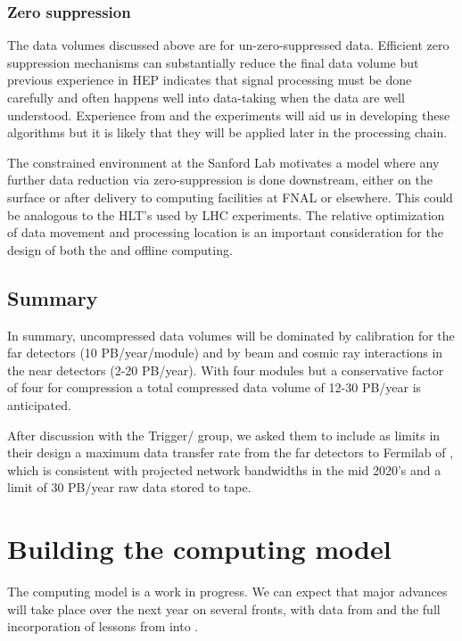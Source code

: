 \subsubsection{Zero suppression}

The data volumes discussed above are for un-zero-suppressed data.  Efficient zero suppression mechanisms can substantially reduce the final data volume but previous experience in HEP indicates that signal processing must be done carefully and often happens well into data-taking when the data are well understood.  Experience from   and the  experiments will aid us in developing these algorithms but it is likely that they will be applied later in the processing chain. 

The constrained environment at the Sanford Lab motivates a model where any further data reduction via zero-suppression is done downstream, either on the surface or after delivery to computing facilities at FNAL or elsewhere. This could be analogous to the HLT's used by LHC experiments. The relative optimization of data movement and processing location is an important consideration for the design of both the  and offline computing.

\subsection{Summary}
In summary, uncompressed data volumes will be dominated by calibration for the far detectors (10 PB/year/module) and by beam and cosmic ray interactions in the near detectors (2-20 PB/year).   With four  modules but a conservative factor of four for compression a total compressed data volume of 12-30 PB/year is anticipated. 

After discussion with the Trigger/ group, we asked them to include as limits in their design a  maximum data transfer rate from the far detectors to Fermilab of \surffnalbw, which is consistent with projected network bandwidths in the mid 2020's and a limit of 30 PB/year raw data stored to tape.  



\section{Building the computing model}\label{sw:bld-cmp-mdl}

The   computing model is a work in progress.  We can expect that major advances will take place over the next year on several fronts, with data from  and the full incorporation of lessons from   into  . 



